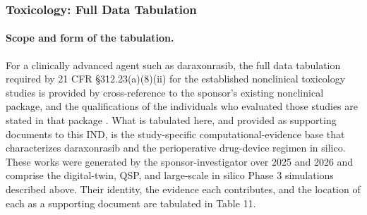 \subsubsection{Toxicology: Full Data Tabulation}

\paragraph{Scope and form of the tabulation.}
For a clinically advanced agent such as daraxonrasib, the full data tabulation
required by 21 CFR \S 312.23(a)(8)(ii) for the established nonclinical
toxicology studies is provided by cross-reference to the sponsor's existing
nonclinical package, and the qualifications of the individuals who evaluated
those studies are stated in that package \cite{phase1guidance,daraxwhipple}.
What is tabulated here, and provided as supporting documents to this IND, is the
study-specific computational-evidence base that characterizes daraxonrasib and
the perioperative drug-device regimen in silico. These works were generated by
the sponsor-investigator over 2025 and 2026 and comprise the digital-twin, QSP,
and large-scale in silico Phase 3 simulations described above. Their identity,
the evidence each contributes, and the location of each as a supporting document
are tabulated in Table 11.

